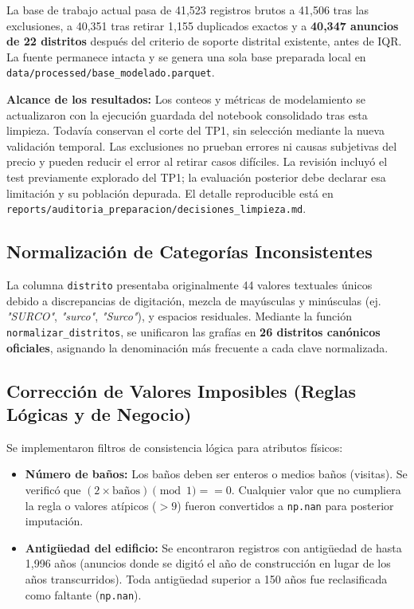 \documentclass[11pt,a4paper]{article}
\begin{document}
La base de trabajo actual pasa de 41,523 registros brutos a 41,506 tras las exclusiones, a 40,351 tras retirar 1,155 duplicados exactos y a \textbf{40,347 anuncios de 22 distritos} después del criterio de soporte distrital existente, antes de IQR. La fuente permanece intacta y se genera una sola base preparada local en \texttt{data/processed/base\_modelado.parquet}.

\noindent\textbf{Alcance de los resultados:} Los conteos y métricas de modelamiento se actualizaron con la ejecución guardada del notebook consolidado tras esta limpieza. Todavía conservan el corte del TP1, sin selección mediante la nueva validación temporal. Las exclusiones no prueban errores ni causas subjetivas del precio y pueden reducir el error al retirar casos difíciles. La revisión incluyó el test previamente explorado del TP1; la evaluación posterior debe declarar esa limitación y su población depurada. El detalle reproducible está en \texttt{reports/auditoria\_preparacion/decisiones\_limpieza.md}.

\subsection{Normalización de Categorías Inconsistentes}
La columna \texttt{distrito} presentaba originalmente 44 valores textuales únicos debido a discrepancias de digitación, mezcla de mayúsculas y minúsculas (ej. \textit{"SURCO"}, \textit{"surco"}, \textit{"Surco"}), y espacios residuales. Mediante la función \texttt{normalizar\_distritos}, se unificaron las grafías en \textbf{26 distritos canónicos oficiales}, asignando la denominación más frecuente a cada clave normalizada.

\subsection{Corrección de Valores Imposibles (Reglas Lógicas y de Negocio)}
Se implementaron filtros de consistencia lógica para atributos físicos:
\begin{itemize}[leftmargin=1.5cm]
    \item \textbf{Número de baños:} Los baños deben ser enteros o medios baños (visitas). Se verificó que $(2 \times \text{baños}) \pmod 1 == 0$. Cualquier valor que no cumpliera la regla o valores atípicos ($> 9$) fueron convertidos a \texttt{np.nan} para posterior imputación.
    \item \textbf{Antigüedad del edificio:} Se encontraron registros con antigüedad de hasta 1,996 años (anuncios donde se digitó el año de construcción en lugar de los años transcurridos). Toda antigüedad superior a 150 años fue reclasificada como faltante (\texttt{np.nan}).
\end{itemize}
\end{document}
